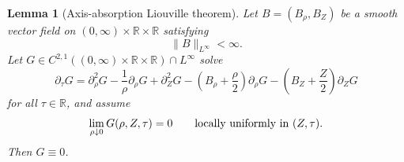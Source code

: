 \documentclass[11pt]{amsart}
\numberwithin{equation}{section}
\theoremstyle{plain}
\newtheorem{lemma}[lemma]{Lemma}
\theoremstyle{definition}
\theoremstyle{remark}
\begin{document}
\begin{lemma}[Axis-absorption Liouville theorem]
\label{lem:axis-absorption-liouville}
Let \(B=(B_\rho,B_Z)\) be a smooth vector field on
\((0,\infty)\times\mathbb R\times\mathbb R\) satisfying
\[
   \|B\|_{L^\infty}<\infty .
\]
Let \(G\in C^{2,1}((0,\infty)\times\mathbb R\times\mathbb R)\cap L^\infty\)
solve
\begin{equation}\label{eq:abstract-Gamma-equation}
   \partial_\tau G
   =
   \partial_\rho^2G-\frac1\rho\partial_\rho G+
      \partial_Z^2G
   -\left(B_\rho+\frac\rho2\right)\partial_\rho G
   -\left(B_Z+\frac Z2\right)\partial_ZG
\end{equation}
for all \(\tau\in\mathbb R\), and assume
\begin{equation}\label{eq:abstract-axis-zero}
   \lim_{\rho\downarrow0}G(\rho,Z,\tau)=0
   \qquad\hbox{locally uniformly in }(Z,\tau).
\end{equation}
Then \(G\equiv0\).
\end{lemma}
\end{document}
